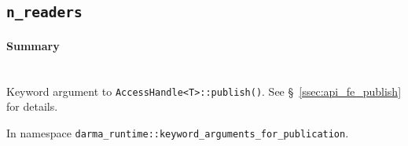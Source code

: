 \subsection{\texttt{n\_readers}}

\paragraph{Summary}\mbox{}\\ 

Keyword argument to \texttt{AccessHandle<T>::publish()}.  See
\S~\ref{ssec:api_fe_publish} for details.

In namespace \texttt{darma\_runtime::keyword\_arguments\_for\_publication}.

%
%
%
%
%
%




